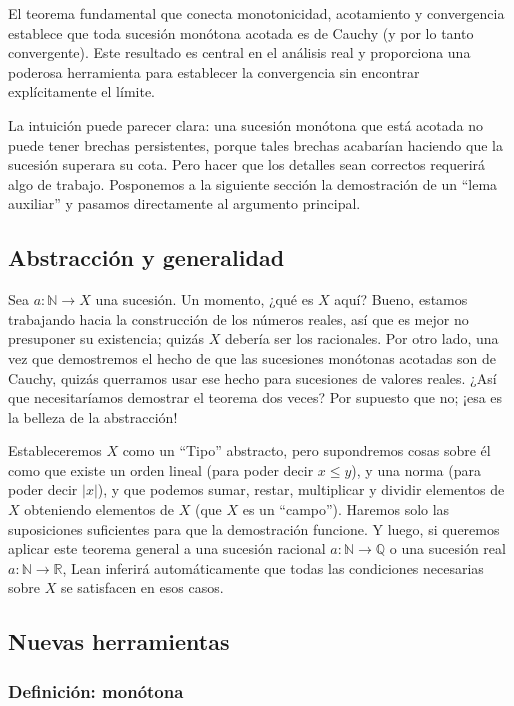 El teorema fundamental que conecta monotonicidad, acotamiento y
convergencia establece que toda sucesión monótona acotada es de Cauchy (y
por lo tanto convergente). Este resultado es central en el análisis real y
proporciona una poderosa herramienta para establecer la convergencia sin
encontrar explícitamente el límite.

La intuición puede parecer clara: una sucesión monótona que está acotada
no puede tener brechas persistentes, porque tales brechas acabarían
haciendo que la sucesión superara su cota. Pero hacer que los detalles
sean correctos requerirá algo de trabajo. Posponemos a la siguiente
sección la demostración de un ``lema auxiliar'' y pasamos directamente al
argumento principal.

\subsection{Abstracción y generalidad}

Sea $a : \mathbb{N} \to X$ una sucesión. Un momento, ¿qué es $X$ aquí?
Bueno, estamos trabajando hacia la construcción de los números reales, así
que es mejor no presuponer su existencia; quizás $X$ debería ser los
racionales. Por otro lado, una vez que demostremos el hecho de que las
sucesiones monótonas acotadas son de Cauchy, quizás querramos usar ese
hecho para sucesiones de valores reales. ¿Así que necesitaríamos demostrar
el teorema dos veces? Por supuesto que no; ¡esa es la belleza de la
abstracción!

Estableceremos $X$ como un ``Tipo'' abstracto, pero supondremos cosas
sobre él como que existe un orden lineal (para poder decir $x \leq y$),
y una norma (para poder decir $|x|$), y que podemos sumar, restar,
multiplicar y dividir elementos de $X$ obteniendo elementos de $X$ (que
$X$ es un ``campo''). Haremos solo las suposiciones suficientes para que
la demostración funcione. Y luego, si queremos aplicar este teorema
general a una sucesión racional $a : \mathbb{N} \to \mathbb{Q}$ o una
sucesión real $a : \mathbb{N} \to \mathbb{R}$, Lean inferirá
automáticamente que todas las condiciones necesarias sobre $X$ se
satisfacen en esos casos.

\subsection{Nuevas herramientas}

\subsubsection{Definición: monótona}

